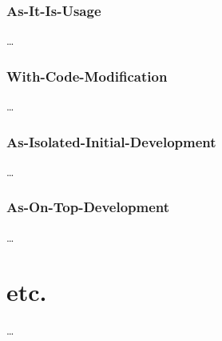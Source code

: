 \subsubsection{As-It-Is-Usage}
\ldots
\subsubsection{With-Code-Modification}
\ldots
\subsubsection{As-Isolated-Initial-Development}
\ldots
\subsubsection{As-On-Top-Development}
\ldots

\section{etc.}
\ldots


%
